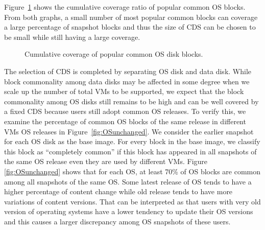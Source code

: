 Figure~\ref{fig:OSdatacoverage} shows the cumulative coverage  ratio of  popular common OS blocks. 
From both graphs, a small number of most popular common blocks can coverage a large percentage of 
snapshot blocks and thus the size of CDS can be chosen to be small while still having a large
coverage. 

\begin{figure}
\centering
\caption{ Cumulative  coverage of popular common OS disk blocks.}
\label{fig:OSdatacoverage}
\end{figure}





The selection of CDS is completed by separating OS disk and data disk.
While block commonality among data disks may be affected in some degree
 when we scale up the number of total VMs  to be supported,
we expect that  the block commonality among OS disks still remains to be high and  
can be well covered by a fixed CDS because users still adopt common OS releases.
To  verify this,  we examine the percentage of common  OS blocks of the same
release in different VMs  OS releases in Figure~\ref{fig:OSunchanged}. 
We consider the earlier snapshot for each OS disk as the base image.
For every block in the base image, 
we classify this block as ``completely common''
if  this block has appeared in all snapshots of the same OS release even they are used by different VMs.
Figure \ref{fig:OSunchanged} shows that for each
OS,  at least 70\% of OS blocks are common among all snapshots of the same OS. 
Some latest release  of OS tends to have a higher percentage of content change
while  old release tends to have more variations of content versions.
That can be interpreted as that users with very old  version of operating systems
have a lower tendency to update their OS versions and this causes a larger discrepancy
among OS snapshots of these users.

